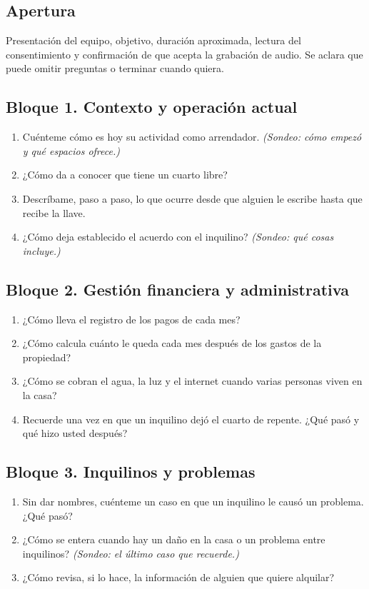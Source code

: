 \documentclass[11pt,a4paper]{article}
\begin{document}
\subsection*{Apertura}
Presentación del equipo, objetivo, duración aproximada, lectura del consentimiento y confirmación de que acepta la grabación de audio. Se aclara que puede omitir preguntas o terminar cuando quiera.

\subsection*{Bloque 1. Contexto y operación actual}
\begin{enumerate}[label=\textbf{G\arabic*.},start=1]
\item Cuénteme cómo es hoy su actividad como arrendador. \textit{(Sondeo: cómo empezó y qué espacios ofrece.)}
\item ¿Cómo da a conocer que tiene un cuarto libre?
\item Descríbame, paso a paso, lo que ocurre desde que alguien le escribe hasta que recibe la llave.
\item ¿Cómo deja establecido el acuerdo con el inquilino? \textit{(Sondeo: qué cosas incluye.)}
\end{enumerate}

\subsection*{Bloque 2. Gestión financiera y administrativa}
\begin{enumerate}[label=\textbf{G\arabic*.},start=5]
\item ¿Cómo lleva el registro de los pagos de cada mes?
\item ¿Cómo calcula cuánto le queda cada mes después de los gastos de la propiedad?
\item ¿Cómo se cobran el agua, la luz y el internet cuando varias personas viven en la casa?
\item Recuerde una vez en que un inquilino dejó el cuarto de repente. ¿Qué pasó y qué hizo usted después?
\end{enumerate}

\subsection*{Bloque 3. Inquilinos y problemas}
\begin{enumerate}[label=\textbf{G\arabic*.},start=9]
\item Sin dar nombres, cuénteme un caso en que un inquilino le causó un problema. ¿Qué pasó?
\item ¿Cómo se entera cuando hay un daño en la casa o un problema entre inquilinos? \textit{(Sondeo: el último caso que recuerde.)}
\item ¿Cómo revisa, si lo hace, la información de alguien que quiere alquilar?
\end{enumerate}
\end{document}
